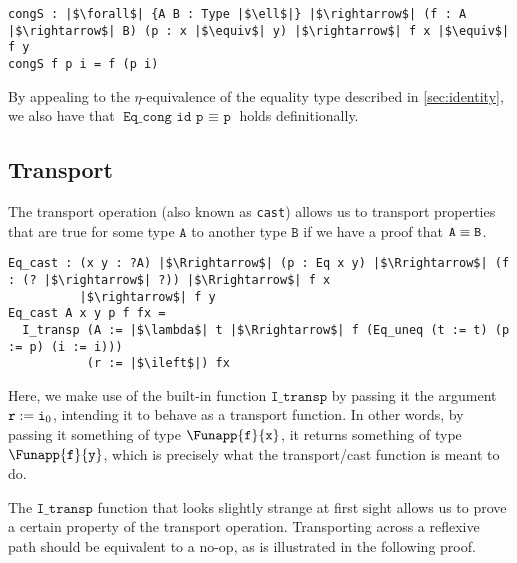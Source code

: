 \documentclass[12pt,twoside,maitrise]{dms}
\theoremstyle{definition}
\numberwithin{equation}{section}
\numberwithin{table}{chapter}
\numberwithin{figure}{chapter}
\newcommand\id[1] {\texttt{#1}}
\newcommand\fn[1] {\texttt{#1}}
\begin{document}
\begin{verbatim}
congS : |$\forall$| {A B : Type |$\ell$|} |$\rightarrow$| (f : A |$\rightarrow$| B) (p : x |$\equiv$| y) |$\rightarrow$| f x |$\equiv$| f y
congS f p i = f (p i)
\end{verbatim}

By appealing to the $\eta$-equivalence of the equality type described in
\autoref{sec:identity}, we also have that $\fn{Eq\_cong id p $\equiv$ p}$ holds
definitionally.

\subsection*{Transport}
The transport operation (also known as {\id{cast}}) allows us to transport
properties that are true for some type $\id{A}$ to another type $\id{B}$ if we
have a proof that $\eqtype{\id{A}}{\id{B}}$.


\begin{verbatim}
Eq_cast : (x y : ?A) |$\Rrightarrow$| (p : Eq x y) |$\Rrightarrow$| (f : (? |$\rightarrow$| ?)) |$\Rrightarrow$| f x
          |$\rightarrow$| f y
Eq_cast A x y p f fx =
  I_transp (A := |$\lambda$| t |$\Rrightarrow$| f (Eq_uneq (t := t) (p := p) (i := i)))
           (r := |$\ileft$|) fx
\end{verbatim}

Here, we make use of the built-in function $\id{I\_transp}$ by passing it the
argument $\earg{\id{r}}{\ileft}$, intending it to behave as a transport
function. In other words, by passing it something of type
$\Funapp{\id{f}}{\id{x}}$, it returns something of type
$\Funapp{\id{f}}{\id{y}}$, which is precisely what the transport/cast function
is meant to do.

The $\id{I\_transp}$ function that looks slightly strange at first sight allows
us to prove a certain property of the transport operation. Transporting across a
reflexive path should be equivalent to a no-op, as is illustrated in the
following proof.
\end{document}
